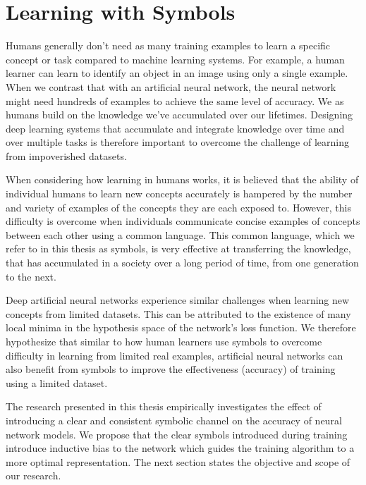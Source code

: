 \section{Learning with Symbols} \label{sec:introduction-learning-symbols}

Humans generally don't need as many training examples to learn a specific concept or task compared to machine learning systems. For example, a human learner can learn to identify an object in an image using only a single example. When we contrast that with an artificial neural network, the neural network might need hundreds of examples to achieve the same level of accuracy. We as humans build on the knowledge we've accumulated over our lifetimes\cite{Thrun1998}. Designing deep learning systems that accumulate and integrate knowledge over time and over multiple tasks is therefore important to overcome the challenge of learning from impoverished datasets\cite{silver2013lifelong}.

When considering how learning in humans works, it is believed that the ability of individual humans to learn new concepts accurately is hampered by the number and variety of examples of the concepts they are each exposed to. However, this difficulty is overcome when individuals communicate concise examples of concepts between each other using a common language\cite{DBLP:journals/corr/abs-1203-2990}. This common language, which we refer to in this thesis as symbols, is very effective at transferring the knowledge, that has accumulated in a society over a long period of time, from one generation to the next.

Deep artificial neural networks experience similar challenges when learning new concepts from limited datasets. This can be attributed to the existence of many local minima in the hypothesis space of the network's loss function\cite{Larochelle:2009:EST:1577069.1577070}. We therefore hypothesize that similar to how human learners use symbols to overcome difficulty in learning from limited real examples, artificial neural networks can also benefit from symbols to improve the effectiveness (accuracy) of training using a limited dataset.

The research presented in this thesis empirically investigates the effect of introducing a clear and consistent symbolic channel on the accuracy of neural network models. We propose that the clear symbols introduced during training introduce inductive bias to the network which guides the training algorithm to a more optimal representation\cite{Thrun1998}. The next section states the objective and scope of our research.